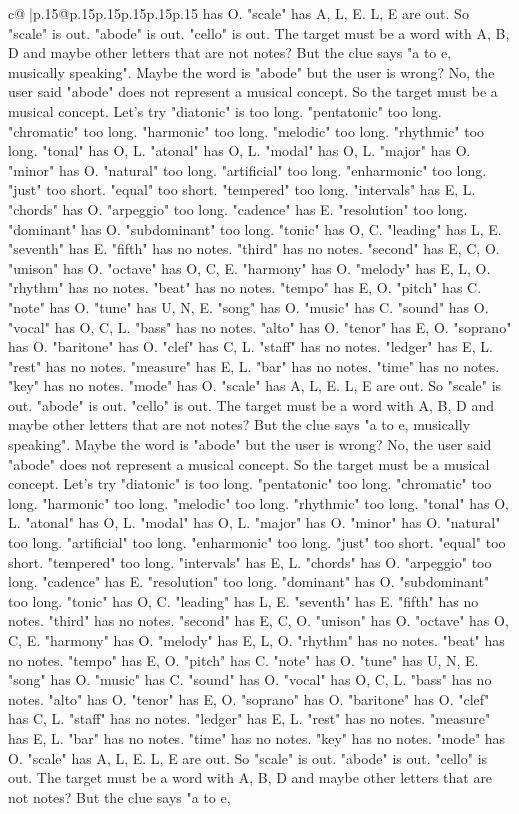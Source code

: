 \documentclass{article}
\begin{document}
{\begin{supertabular}{c@{$\;$}|p{.15\linewidth}@{}p{.15\linewidth}p{.15\linewidth}p{.15\linewidth}p{.15\linewidth}p{.15\linewidth}}
{{{has O. "scale" has A, L, E. L, E are out. So "scale" is out. "abode" is out. "cello" is out. The target must be a word with A, B, D and maybe other letters that are not notes? But the clue says "a to e, musically speaking". Maybe the word is "abode" but the user is wrong? No, the user said "abode" does not represent a musical concept. So the target must be a musical concept. Let's try "diatonic" is too long. "pentatonic" too long. "chromatic" too long. "harmonic" too long. "melodic" too long. "rhythmic" too long. "tonal" has O, L. "atonal" has O, L. "modal" has O, L. "major" has O. "minor" has O. "natural" too long. "artificial" too long. "enharmonic" too long. "just" too short. "equal" too short. "tempered" too long. "intervals" has E, L. "chords" has O. "arpeggio" too long. "cadence" has E. "resolution" too long. "dominant" has O. "subdominant" too long. "tonic" has O, C. "leading" has L, E. "seventh" has E. "fifth" has no notes. "third" has no notes. "second" has E, C, O. "unison" has O. "octave" has O, C, E. "harmony" has O. "melody" has E, L, O. "rhythm" has no notes. "beat" has no notes. "tempo" has E, O. "pitch" has C. "note" has O. "tune" has U, N, E. "song" has O. "music" has C. "sound" has O. "vocal" has O, C, L. "bass" has no notes. "alto" has O. "tenor" has E, O. "soprano" has O. "baritone" has O. "clef" has C, L. "staff" has no notes. "ledger" has E, L. "rest" has no notes. "measure" has E, L. "bar" has no notes. "time" has no notes. "key" has no notes. "mode" has O. "scale" has A, L, E. L, E are out. So "scale" is out. "abode" is out. "cello" is out. The target must be a word with A, B, D and maybe other letters that are not notes? But the clue says "a to e, musically speaking". Maybe the word is "abode" but the user is wrong? No, the user said "abode" does not represent a musical concept. So the target must be a musical concept. Let's try "diatonic" is too long. "pentatonic" too long. "chromatic" too long. "harmonic" too long. "melodic" too long. "rhythmic" too long. "tonal" has O, L. "atonal" has O, L. "modal" has O, L. "major" has O. "minor" has O. "natural" too long. "artificial" too long. "enharmonic" too long. "just" too short. "equal" too short. "tempered" too long. "intervals" has E, L. "chords" has O. "arpeggio" too long. "cadence" has E. "resolution" too long. "dominant" has O. "subdominant" too long. "tonic" has O, C. "leading" has L, E. "seventh" has E. "fifth" has no notes. "third" has no notes. "second" has E, C, O. "unison" has O. "octave" has O, C, E. "harmony" has O. "melody" has E, L, O. "rhythm" has no notes. "beat" has no notes. "tempo" has E, O. "pitch" has C. "note" has O. "tune" has U, N, E. "song" has O. "music" has C. "sound" has O. "vocal" has O, C, L. "bass" has no notes. "alto" has O. "tenor" has E, O. "soprano" has O. "baritone" has O. "clef" has C, L. "staff" has no notes. "ledger" has E, L. "rest" has no notes. "measure" has E, L. "bar" has no notes. "time" has no notes. "key" has no notes. "mode" has O. "scale" has A, L, E. L, E are out. So "scale" is out. "abode" is out. "cello" is out. The target must be a word with A, B, D and maybe other letters that are not notes? But the clue says "a to e, }}}
\end{supertabular}}
\end{document}
